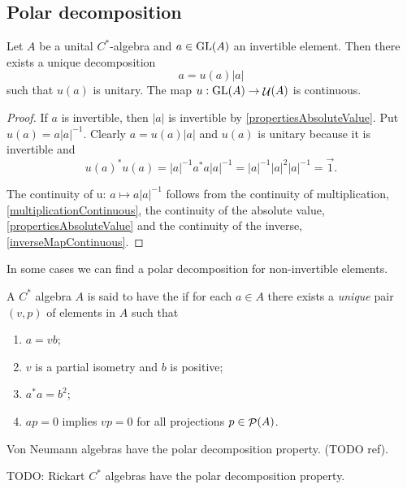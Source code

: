\subsection{Polar decomposition}
\begin{proposition}
Let $A$ be a unital $C^*$-algebra and $a\in \operatorname{GL}(A)$ an invertible element. Then there exists a unique decomposition
\[ a = u(a) |a| \]
such that $u(a)$ is unitary. The map $u: \operatorname{GL}(A) \to \mathop{\mathcal{U}}\nolimits(A)$ is continuous.
\end{proposition}
\begin{proof}
If $a$ is invertible, then $|a|$ is invertible by \ref{propertiesAbsoluteValue}. Put $u(a) = a|a|^{-1}$. Clearly $a = u(a)|a|$ and $u(a)$ is unitary because it is invertible and
\[ u(a)^*u(a) = |a|^{-1}a^*a|a|^{-1} = |a|^{-1}|a|^2|a|^{-1} = \vec{1}. \]

The continuity of u: $a\mapsto a|a|^{-1}$ follows from the continuity of multiplication, \ref{multiplicationContinuous}, the continuity of the absolute value, \ref{propertiesAbsoluteValue} and the continuity of the inverse, \ref{inverseMapContinuous}.
\end{proof}

In some cases we can find a polar decomposition for non-invertible elements.
\begin{definition}
A $C^*$ algebra $A$ is said to have the  if for each $a\in A$ there exists a \emph{unique} pair $(v,p)$ of elements in $A$ such that
\begin{enumerate}
\item $a = vb$;
\item $v$ is a partial isometry and $b$ is positive;
\item $a^*a = b^2$;
\item $ap = 0$ implies $vp = 0$ for all projections $p\in\mathop{\mathcal{P}}\nolimits(A)$.
\end{enumerate}
\end{definition}
Von Neumann algebras have the polar decomposition property. (TODO ref).

TODO: Rickart $C^*$ algebras have the polar decomposition property.

